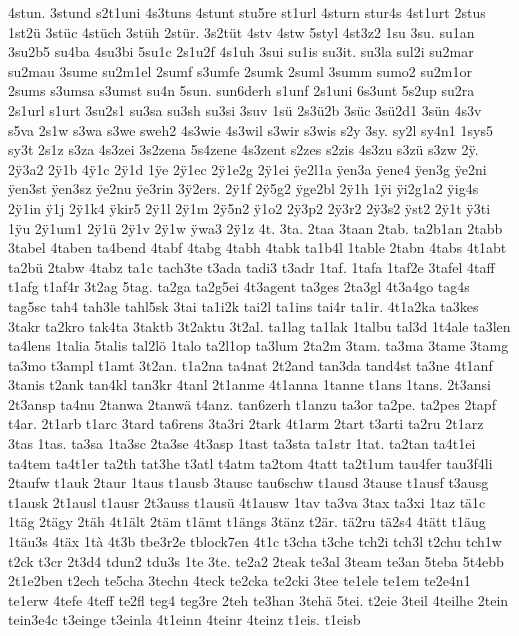{4stun.
3stund
s2t1uni
4s3tuns
4stunt
stu5re
st1url
4sturn
stur4s
4st1urt
2stus
1st2ü
3stüc
4stüch
3stüh
2stür.
3s2tüt
4stv
4stw
5styl
4st3z2
1su
3su.
su1an
3su2b5
su4ba
4su3bi
5su1c
2s1u2f
4s1uh
3sui
su1is
su3it.
su3la
sul2i
su2mar
su2mau
3sume
su2m1el
2sumf
s3umfe
2sumk
2suml
3summ
sumo2
su2m1or
2sums
s3umsa
s3umst
su4n
5sun.
sun6derh
s1unf
2s1uni
6s3unt
5s2up
su2ra
2s1url
s1urt
3su2s1
su3sa
su3sh
su3si
3suv
1sü
2s3ü2b
3süc
3sü2d1
3sün
4s3v
s5va
2s1w
s3wa
s3we
sweh2
4s3wie
4s3wil
s3wir
s3wis
s2y
3sy.
sy2l
sy4n1
1sys5
sy3t
2s1z
s3za
4s3zei
3s2zena
5s4zene
4s3zent
s2zes
s2zis
4s3zu
s3zü
s3zw
2^^ff.
2^^ff3a2
2^^ff1b
4^^ff1c
2^^ff1d
1^^ffe
2^^ff1ec
2^^ff1e2g
2^^ff1ei
^^ffe2l1a
^^ffen3a
^^ffene4
^^ffen3g
^^ffe2ni
^^ffen3st
^^ffen3sz
^^ffe2nu
^^ffe3rin
3^^ff2ers.
2^^ff1f
2^^ff5g2
^^ffge2bl
2^^ff1h
1^^ffi
^^ffi2g1a2
^^ffig4s
2^^ff1in
^^ff1j
2^^ff1k4
^^ffkir5
2^^ff1l
2^^ff1m
2^^ff5n2
^^ff1o2
2^^ff3p2
2^^ff3r2
2^^ff3s2
^^ffst2
2^^ff1t
^^ff3ti
1^^ffu
2^^ff1um1
2^^ff1ü
2^^ff1v
2^^ff1w
^^ffwa3
2^^ff1z
4t.
3ta.
2taa
3taan
2tab.
ta2b1an
2tabb
3tabel
4taben
ta4bend
4tabf
4tabg
4tabh
4tabk
ta1b4l
1table
2tabn
4tabs
4t1abt
ta2bü
2tabw
4tabz
ta1c
tach3te
t3ada
tadi3
t3adr
1taf.
1tafa
1taf2e
3tafel
4taff
t1afg
t1af4r
3t2ag
5tag.
ta2ga
ta2g5ei
4t3agent
ta3ges
2ta3gl
4t3a4go
tag4s
tag5sc
tah4
tah3le
tahl5sk
3tai
ta1i2k
tai2l
ta1ins
tai4r
ta1ir.
4t1a2ka
ta3kes
3takr
ta2kro
tak4ta
3taktb
3t2aktu
3t2al.
ta1lag
ta1lak
1talbu
tal3d
1t4ale
ta3len
ta4lens
1talia
5talis
tal2lö
1talo
ta2l1op
ta3lum
2ta2m
3tam.
ta3ma
3tame
3tamg
ta3mo
t3ampl
t1amt
3t2an.
t1a2na
ta4nat
2t2and
tan3da
tand4st
ta3ne
4t1anf
3tanis
t2ank
tan4kl
tan3kr
4tanl
2t1anme
4t1anna
1tanne
t1ans
1tans.
2t3ansi
2t3ansp
ta4nu
2tanwa
2tanwä
t4anz.
tan6zerh
t1anzu
ta3or
ta2pe.
ta2pes
2tapf
t4ar.
2t1arb
t1arc
3tard
ta6rens
3ta3ri
2tark
4t1arm
2tart
t3arti
ta2ru
2t1arz
3tas
1tas.
ta3sa
1ta3sc
2ta3se
4t3asp
1tast
ta3sta
ta1str
1tat.
ta2tan
ta4t1ei
ta4tem
ta4t1er
ta2th
tat3he
t3atl
t4atm
ta2tom
4tatt
ta2t1um
tau4fer
tau3f4li
2taufw
t1auk
2taur
1taus
t1ausb
3tausc
tau6schw
t1ausd
3tause
t1ausf
t3ausg
t1ausk
2t1ausl
t1ausr
2t3auss
t1ausü
4t1ausw
1tav
ta3va
3tax
ta3xi
1taz
tä1c
1täg
2tägy
2täh
4t1ält
2täm
t1ämt
t1ängs
3tänz
t2är.
tä2ru
tä2s4
4tätt
t1äug
1täu3s
4täx
1tà
4t3b
tbe3r2e
tblock7en
4t1c
t3cha
t3che
tch2i
tch3l
t2chu
tch1w
t2ck
t3cr
2t3d4
tdun2
tdu3s
1te
3te.
te2a2
2teak
te3al
3team
te3an
5teba
5t4ebb
2t1e2ben
t2ech
te5cha
3techn
4teck
te2cka
te2cki
3tee
te1ele
te1em
te2e4n1
te1erw
4tefe
4teff
te2fl
teg4
teg3re
2teh
te3han
3tehä
5tei.
t2eie
3teil
4teilhe
2tein
tein3e4c
t3einge
t3einla
4t1einn
4teinr
4teinz
t1eis.
t1eisb
}
